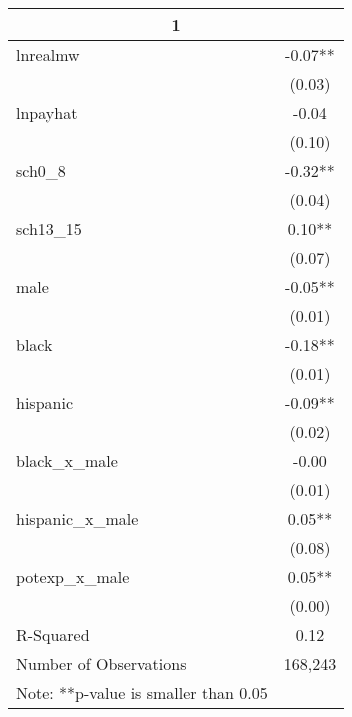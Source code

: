\documentclass{article}
\begin{document}
\begin{table}[ht]
\centering
\caption{}
\label{my-label}
\begin{tabular}{lc}
\hline
\multicolumn{2}{c}{1} \\
\hline
lnrealmw               & -0.07**  \\
                       & (0.03)  \\
lnpayhat               & -0.04  \\
                       & (0.10)   \\
sch0\_8                & -0.32** \\
                       & (0.04)\\
sch13\_15              & 0.10**\\
                       & (0.07)\\
male                   & -0.05**\\
                       & (0.01) \\
black                  & -0.18**\\
                       & (0.01)\\
hispanic               & -0.09**\\
                       & (0.02)\\
black\_x\_male         & -0.00\\
                       & (0.01) \\
hispanic\_x\_male      & 0.05**\\
                       & (0.08) \\
potexp\_x\_male        & 0.05** \\
                       & (0.00) \\
R-Squared              & 0.12 \\
Number of Observations & 168,243\\
\hline
Note: **p-value is smaller than 0.05
\end{tabular}
\end{table}
\end{document}
